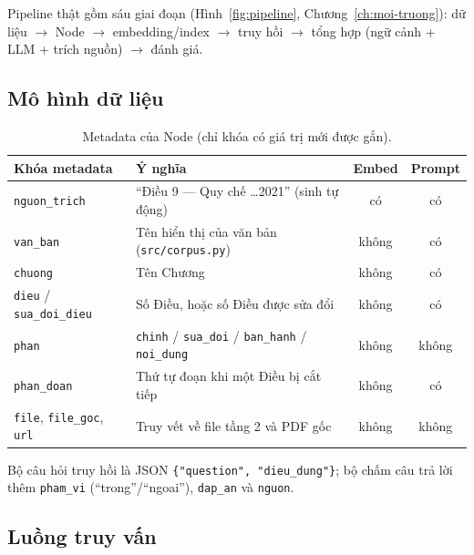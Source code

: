 Pipeline thật gồm sáu giai đoạn (Hình~\ref{fig:pipeline}, Chương~\ref{ch:moi-truong}): dữ liệu
$\rightarrow$ Node $\rightarrow$ embedding/index $\rightarrow$ truy hồi $\rightarrow$ tổng hợp (ngữ cảnh + LLM
+ trích nguồn) $\rightarrow$ đánh giá.

\subsection{Mô hình dữ liệu}

\begin{table}[H]
  \centering
  \small
  \begin{tabularx}{\textwidth}{l X c c}
    \toprule
    \textbf{Khóa metadata} & \textbf{Ý nghĩa} & \textbf{Embed} & \textbf{Prompt} \\
    \midrule
    \texttt{nguon\_trich} & ``Điều 9 --- Quy chế \ldots 2021'' (sinh tự động) & có & có \\
    \texttt{van\_ban} & Tên hiển thị của văn bản (\texttt{src/corpus.py}) & không & có \\
    \texttt{chuong} & Tên Chương & không & có \\
    \texttt{dieu} / \texttt{sua\_doi\_dieu} & Số Điều, hoặc số Điều được sửa đổi & không & có \\
    \texttt{phan} & \texttt{chinh} / \texttt{sua\_doi} / \texttt{ban\_hanh} / \texttt{noi\_dung} & không & không \\
    \texttt{phan\_doan} & Thứ tự đoạn khi một Điều bị cắt tiếp & không & có \\
    \texttt{file}, \texttt{file\_goc}, \texttt{url} & Truy vết về file tầng 2 và PDF gốc & không & không \\
    \bottomrule
  \end{tabularx}
  \caption{Metadata của Node (chỉ khóa có giá trị mới được gắn).}
\end{table}

Bộ câu hỏi truy hồi là JSON \texttt{\{"question", "dieu\_dung"\}}; bộ chấm câu trả lời thêm
\texttt{pham\_vi} (``trong''/``ngoai''), \texttt{dap\_an} và \texttt{nguon}.

\subsection{Luồng truy vấn}

